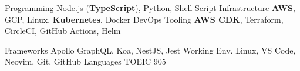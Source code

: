 

\begin{minipage}[t]{\dimexpr(\linewidth/2) - 3em}
  \vspace{-0.8em}
  \begin{cvskills}
    \cvskill
      {Programming}
      {Node.js (\textbf{TypeScript}), Python, Shell Script}
    \cvskill
      {Infrastructure}
      {\textbf{AWS}, GCP, Linux, \textbf{Kubernetes}, Docker}
    \cvskill
      {DevOps Tooling}
      {\textbf{AWS CDK}, Terraform, CircleCI, GitHub Actions, Helm}
  \end{cvskills}
\end{minipage}
\hfill
\begin{minipage}[t]{\dimexpr(\linewidth/2) - 3em}
  \vspace{-0.8em}
  \begin{cvskills}
    \cvskill
      {Frameworks}
      {Apollo GraphQL, Koa, NestJS, Jest}
    \cvskill
      {Working Env.}
      {Linux, VS Code, Neovim, Git, GitHub}
    \cvskill
      {Languages}
      {TOEIC 905}
  \end{cvskills}
\end{minipage}
